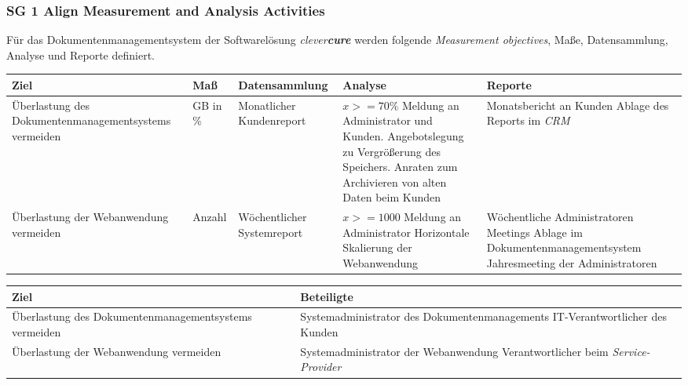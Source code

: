 \subsubsection{SG 1 Align Measurement and Analysis Activities}
Für das Dokumentenmanagementsystem der Softwarelösung  \emph{clever\textbf{cure}} werden folgende \emph{Measurement objectives}, Maße, Datensammlung, Analyse und Reporte definiert.
\bgroup
\def\arraystretch{1.5}%
\begin{tabularx}{\textwidth}{ X | p{50pt} | X | X | X }
	\hline
	\textbf{Ziel} & 
	\textbf{Maß} & 
	\textbf{Datensammlung} &
	\textbf{Analyse} &
	\textbf{Reporte}
	\\ \hline
	
	Überlastung des Dokumentenmanagementsystems vermeiden &
	GB in \% &
	Monatlicher Kundenreport&
	$x>=70\%$ 
	\newline\newline Meldung an Administrator und Kunden.
	\newline\newline Angebotslegung zu Vergrößerung des Speichers. 
	\newline\newline Anraten zum Archivieren von alten Daten beim Kunden&
	Monatsbericht an Kunden
	\newline\newline Ablage des Reports im \emph{CRM}
	\\ \hline
	
	Überlastung der Webanwendung vermeiden  &
	Anzahl &
	Wöchentlicher Systemreport&
	$x>=1000$ 
	\newline\newline Meldung an Administrator
	\newline\newline Horizontale Skalierung der Webanwendung &
	Wöchentliche Administratoren Meetings
	\newline\newline Ablage im Dokumentenmanagementsystem
	\newline\newline Jahresmeeting der Administratoren
	\\ \hline
\end{tabularx}
\begin{tabularx}{\textwidth}{ X | X }
	\hline
	\textbf{Ziel} & 
	\textbf{Beteiligte}
	\\ \hline
	
	Überlastung des Dokumentenmanagementsystems vermeiden &
	Systemadministrator des Dokumentenmanagements 
	\newline 
	IT-Verantwortlicher des Kunden
	\\ \hline
	
	Überlastung der Webanwendung vermeiden &
	Systemadministrator der Webanwendung \newline
	Verantwortlicher beim \emph{Service-Provider}
	\\ \hline
\end{tabularx}
\egroup
